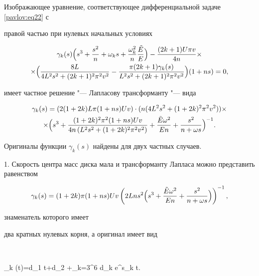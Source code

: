 Изображающее уравнение, соответствующее дифференциальной задаче \eqref{pavlov:eq22} с

правой частью при нулевых начальных условиях

\begin{multline}

\label{pavlov:eq23}

\gamma _k (s)\Bigl(s^3+\frac{s^2}{n}+\omega _k s+\frac{\omega _k^2 }{n}\frac{\tilde {E}}{E} \Bigr)-\frac{(2k+1)U\pi  v 

}{4n}\times\\

\times \Bigl(\frac{8L}{4L^2s^2+(2k+1)^2\pi ^2 v  ^2}-

\frac{\pi (2k+1)\gamma _k (s)}{L^2s^2+(2k+1)^2\pi ^2 v  ^2} \Bigr)(1+ns)=0,

\end{multline}

имеет частное решение "--- Лапласову трансформанту "--- вида 

\begin{multline}

\label{pavlov:eq24}

\gamma _k (s)=(2(1+2k)L\pi (1+ns)U v  )\cdot (n(4L^2s^2+(1+2k)^2\pi

^2 v  ^2))\times \\

\times \Bigl(s^3+\frac{(1+2k)^2\pi^2(1+ns)U v }{4n\left(L^2s^2+(1+2k)^2\pi

^2 v  ^2 \right)}+\frac{\tilde {E}\omega ^2}{En}+\frac{s^2}{n+\omega s} \Bigr)^{-1}.

\end{multline}



Оригиналы функции $\gamma _k (s)$ найдены для двух частных случаев.



1. Скорость центра масс диска мала и трансформанту Лапласа можно представить равенством

$$

\gamma _k (s)=(1+2k)\pi (1+ns)U v  \left(2Lns^2\Bigl(s^3+\frac{\tilde

{E}\omega ^2}{En}+\frac{s^2}{n+\omega s} \Bigr)\right)^{-1},

$$

знаменатель которого имеет

два кратных нулевых корня, а оригинал имеет вид

$$

\gamma _k (t)=d_1 t+d_2 +\sum\limits_{k=3}^6 d_k e^{s_k t}.

